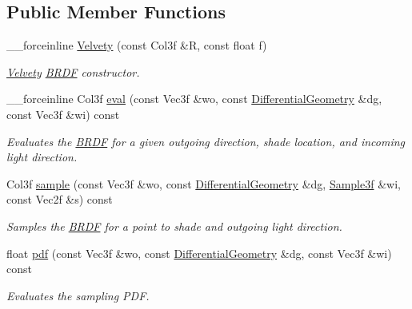 \subsection*{Public Member Functions}
\begin{DoxyCompactItemize}
\item 
\_\-\_\-forceinline \hyperlink{classembree_1_1_velvety_a14ffa0ffbeca356ca12b80f92c015765}{Velvety} (const Col3f \&R, const float f)
\begin{DoxyCompactList}\small\item\em \hyperlink{classembree_1_1_velvety}{Velvety} \hyperlink{classembree_1_1_b_r_d_f}{BRDF} constructor. \item\end{DoxyCompactList}\item 
\_\-\_\-forceinline Col3f \hyperlink{classembree_1_1_velvety_a3dc2e52179a4cf49b9d6afc2c5fbcaab}{eval} (const Vec3f \&wo, const \hyperlink{structembree_1_1_differential_geometry}{DifferentialGeometry} \&dg, const Vec3f \&wi) const 
\begin{DoxyCompactList}\small\item\em Evaluates the \hyperlink{classembree_1_1_b_r_d_f}{BRDF} for a given outgoing direction, shade location, and incoming light direction. \item\end{DoxyCompactList}\item 
Col3f \hyperlink{classembree_1_1_velvety_a3307cabb2d5faae142034856813b5c73}{sample} (const Vec3f \&wo, const \hyperlink{structembree_1_1_differential_geometry}{DifferentialGeometry} \&dg, \hyperlink{structembree_1_1_sample}{Sample3f} \&wi, const Vec2f \&s) const 
\begin{DoxyCompactList}\small\item\em Samples the \hyperlink{classembree_1_1_b_r_d_f}{BRDF} for a point to shade and outgoing light direction. \item\end{DoxyCompactList}\item 
float \hyperlink{classembree_1_1_velvety_a93d6d2cf69e8866244c64079e05c965a}{pdf} (const Vec3f \&wo, const \hyperlink{structembree_1_1_differential_geometry}{DifferentialGeometry} \&dg, const Vec3f \&wi) const 
\begin{DoxyCompactList}\small\item\em Evaluates the sampling PDF. \item\end{DoxyCompactList}\end{DoxyCompactItemize}


